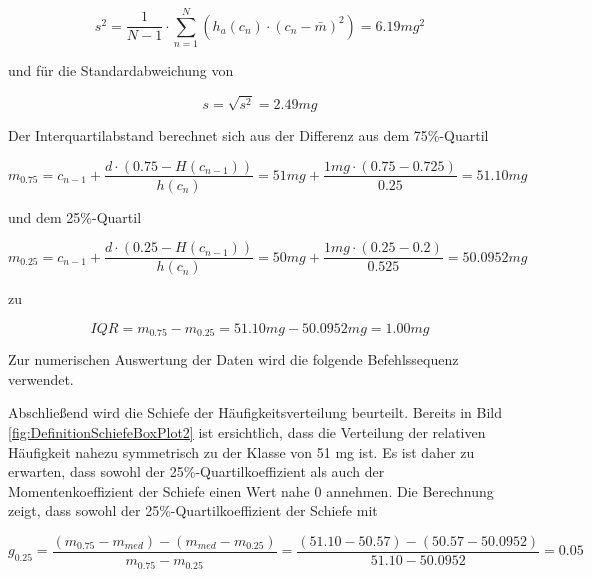 \begin{equation}\label{eq:threeseventyseven}
s^{2} =\dfrac{1}{N-1} \cdot \displaystyle\sum _{n=1}^{N}\left(h_{a} (c_{n})\cdot (c_{n} -\bar{m})^{2} \right) =6.19 mg^{2}
\end{equation}

\noindent und f\"{u}r die Standardabweichung von

\begin{equation}\label{eq:threeseventyeight}
s=\sqrt{s^{2} } =2.49 mg
\end{equation}

\noindent Der Interquartilabstand berechnet sich aus der Differenz aus dem 75\%-Quartil

\begin{equation}\label{eq:threeseventynine}
m_{0.75} =c_{n-1} +\dfrac{d\cdot \left(0.75-H\left(c_{n-1} \right)\right)}{h(c_{n})} =51 mg+\dfrac{1 mg\cdot (0.75-0.725)}{0.25} =51.10 mg
\end{equation}

\noindent und dem 25\%-Quartil

\begin{equation}\label{eq:threeeighty}
m_{0.25} =c_{n-1} +\dfrac{d\cdot \left(0.25-H(c_{n-1} )\right)}{h(c_{n})} =50 mg+\dfrac{1 mg\cdot \left(0.25-0.2\right)}{0.525} =50.0952 mg
\end{equation}

\noindent zu

\begin{equation}\label{eq:threeeightyone}
IQR=m_{0.75} -m_{0.25} =51.10 mg-50.0952 mg=1.00 mg
\end{equation}

\noindent Zur numerischen Auswertung der Daten wird die folgende Befehlssequenz verwendet.



\noindent Abschlie{\ss}end wird die Schiefe der H\"{a}ufigkeitsverteilung beurteilt. Bereits in Bild \ref{fig:DefinitionSchiefeBoxPlot2} ist ersichtlich, dass die Verteilung der relativen H\"{a}ufigkeit nahezu symmetrisch zu der Klasse von 51 mg ist. Es ist daher zu erwarten, dass sowohl der 25\%-Quartilkoeffizient als auch der Momentenkoeffizient der Schiefe einen Wert nahe 0 annehmen. Die Berechnung zeigt, dass sowohl der 25\%-Quartilkoeffizient der Schiefe mit

\begin{equation}\label{eq:threeeightytwo}
g_{0.25} =\dfrac{(m_{0.75} -m_{med})-(m_{med} -m_{0.25} )}{m_{0.75} -m_{0.25}}=\dfrac{(51.10-50.57)-(50.57-50.0952)}{51.10-50.0952} = 0.05
\end{equation}

